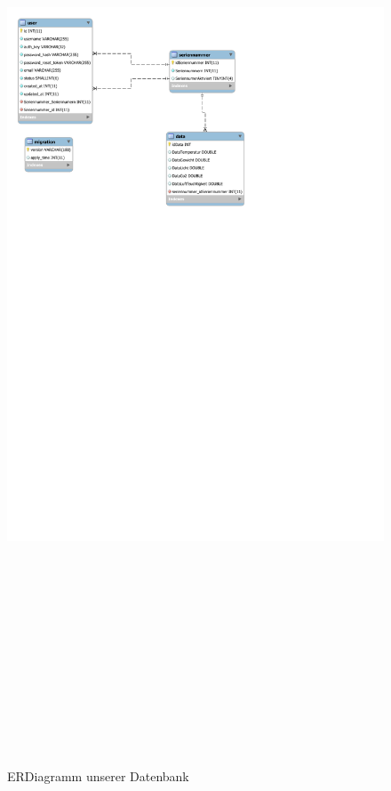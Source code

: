 	\begin{figure}[H]         
	\includegraphics[height=1000pt]{figures/ERDiagramm}
	\caption{ERDiagramm unserer Datenbank}
	\end{figure}
	                                                                                                
